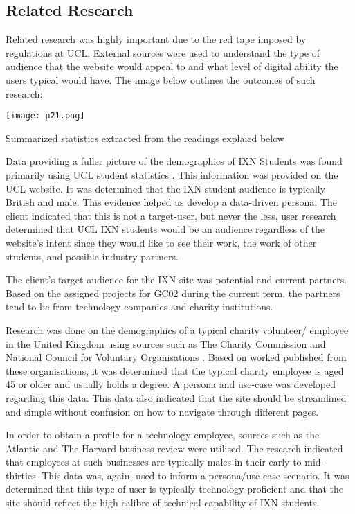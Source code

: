\documentclass[fontsize=11pt]{extarticle}
\numberwithin{figure}{section} %
\begin{document}
\hypertarget{related-research}{%
\subsection{Related Research}\label{related-research}}

Related research was highly important due to the red tape imposed by
regulations at UCL. External sources were used to understand the type of
audience that the website would appeal to and what level of digital
ability the users typical would have. The image below outlines the
outcomes of such research:

\begin{table}[H]
      \centering
      \texttt{[image: p21.png]}
      \caption{Summarized statistics extracted from the readings explaied below}
 \end{table}

Data providing a fuller picture of the demographics of IXN Students was
found primarily using UCL student statistics \cite{ps1}. This
information was provided on the UCL website. It was determined that the
IXN student audience is typically British and male. This evidence helped
us develop a data-driven persona. The client indicated that this is not
a target-user, but never the less, user research determined that UCL IXN
students would be an audience regardless of the website's intent since
they would like to see their work, the work of other students, and
possible industry partners.

The client's target audience for the IXN site was potential and current
partners. Based on the assigned projects for GC02 during the current
term, the partners tend to be from technology companies and charity
institutions.

Research was done on the demographics of a typical charity volunteer/
employee in the United Kingdom using sources such as The Charity
Commission \cite{ps2} and National Council for Voluntary Organisations
\cite{ps3}. Based on worked published from these organisations, it was
determined that the typical charity employee is aged 45 or older and
usually holds a degree. A persona and use-case was developed regarding
this data. This data also indicated that the site should be streamlined
and simple without confusion on how to navigate through different pages.

In order to obtain a profile for a technology employee, sources such as
the Atlantic \cite{ps4} and The Harvard business review \cite{ps5} were
utilised. The research indicated that employees at such businesses are
typically males in their early to mid-thirties. This data was, again,
used to inform a persona/use-case scenario. It was determined that this
type of user is typically technology-proficient and that the site should
reflect the high calibre of technical capability of IXN students.
\end{document}
